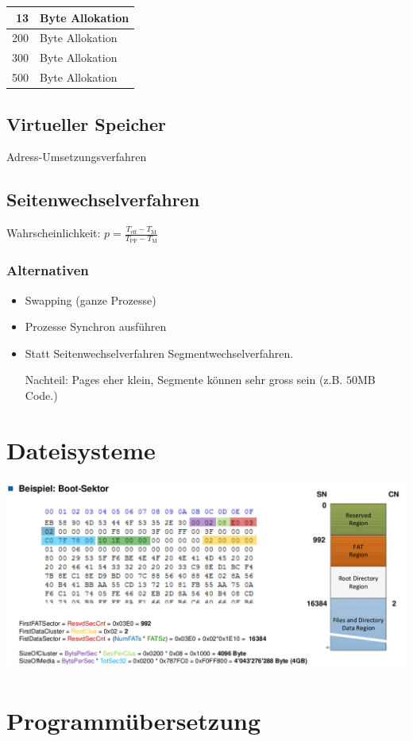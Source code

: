 \begin{tabular}{ | r | l |}
\hline
13 & Byte Allokation \\
\hline
200 & Byte Allokation \\
\hline
300 & Byte Allokation \\
\hline
500 & Byte Allokation \\
\hline
\end{tabular}

\subsection{Virtueller Speicher}

Adress-Umsetzungsverfahren

\subsection{Seitenwechselverfahren}

Wahrscheinlichkeit: $p=\frac{T_\text{eff}-T_\text{M}}{T_\text{PF}-T_\text{M}}$

\subsubsection{Alternativen}

\begin{itemize}
\item Swapping (ganze Prozesse)
\item Prozesse Synchron ausführen
\item Statt Seitenwechselverfahren Segmentwechselverfahren.

	Nachteil: Pages eher klein, Segmente können sehr gross sein (z.B. $50$MB Code.)
\end{itemize}

\section{Dateisysteme}

\includegraphics[width=\linewidth]{img/fat_boot_sector.png}

\section{Programmübersetzung}




